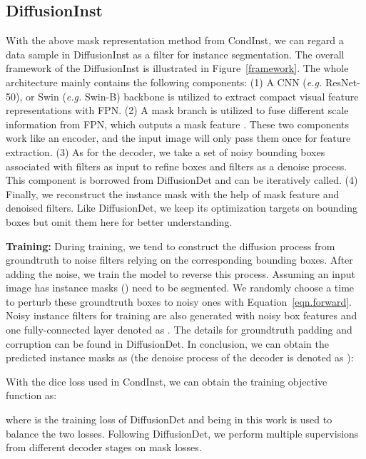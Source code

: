 \documentclass{article}
\begin{document}
\subsection{DiffusionInst}
With the above mask representation method from CondInst, we can regard a data sample in DiffusionInst as a filter  for instance segmentation. The overall framework of the DiffusionInst is illustrated in Figure~\ref{framework}. The whole architecture mainly contains the following components: (1) A CNN (\emph{e.g.} ResNet-50\cite{ResNet}), or Swin (\emph{e.g.} Swin-B\cite{swin}) backbone is utilized to extract compact visual feature representations with FPN\cite{FPN}. (2) A mask branch is utilized to fuse different scale information from FPN, which outputs a mask feature . These two components work like an encoder, and the input image will only pass them once for feature extraction. (3) As for the decoder, we take a set of noisy bounding boxes associated with filters as input to refine boxes and filters as a denoise process. This component is borrowed from DiffusionDet and can be iteratively called. (4) Finally, we reconstruct the instance mask with the help of mask feature  and denoised filters. Like DiffusionDet, we keep its optimization targets on bounding boxes but omit them here for better understanding. 



\noindent \textbf{Training:} During training, we tend to construct the diffusion process from groundtruth to noise filters relying on the corresponding bounding boxes. After adding the noise, we train the model to reverse this process. Assuming an input image has  instance masks () need to be segmented. We randomly choose a time  to perturb these groundtruth boxes to noisy ones with Equation~\ref{eqn.forward}. Noisy instance filters for training are also generated with noisy box features and one fully-connected layer denoted as . The details for groundtruth padding and corruption can be found in DiffusionDet. In conclusion, we can obtain the predicted instance masks as (the denoise process of the decoder is denoted as ): 

With the dice loss\cite{milletari2016v} used in CondInst, we can obtain the training objective function as:

where  is the training loss of DiffusionDet and  being  in this work is used to balance the two losses. Following DiffusionDet, we perform multiple supervisions from different decoder stages on mask losses.
\end{document}
